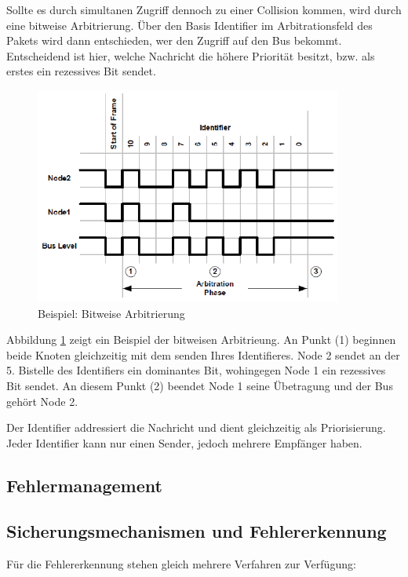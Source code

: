Sollte es durch simultanen Zugriff dennoch zu einer Collision kommen, wird durch eine bitweise Arbitrierung.
Über den Basis Identifier im Arbitrationsfeld des Pakets wird dann entschieden, wer den Zugriff auf den Bus bekommt.
Entscheidend ist hier, welche Nachricht die höhere Priorität besitzt, bzw. als erstes ein rezessives Bit sendet.

\begin{figure}[h] 
\centering
\includegraphics[width=0.9\textwidth]{figures/bitwisearb}
\caption{Beispiel: Bitweise Arbitrierung \citep{BWA}} 
\label{pic:bitwise}
\end{figure} 

Abbildung \ref{pic:bitwise} zeigt ein Beispiel der bitweisen Arbitrieung. An Punkt (1) beginnen beide 
Knoten gleichzeitig mit dem senden Ihres Identifieres. Node 2 sendet an der 5. Bistelle des Identifiers 
ein dominantes Bit, wohingegen Node 1 ein rezessives Bit sendet. An diesem Punkt (2) beendet 
Node 1 seine Übetragung und der Bus gehört Node 2.

Der Identifier addressiert die Nachricht und dient gleichzeitig als Priorisierung. Jeder Identifier kann 
nur einen Sender, jedoch mehrere Empfänger haben.
	
\subsection{Fehlermanagement}

\subsection{Sicherungsmechanismen und Fehlererkennung}
\label{sec:security}

Für die Fehlererkennung stehen gleich mehrere Verfahren zur Verfügung:


